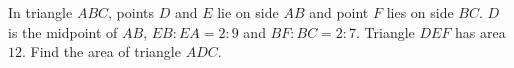 In triangle $ABC$, points $D$ and $E$ lie on side $AB$ and point $F$ lies on side $BC$. $D$ is the midpoint of $AB$, $EB:EA=2:9$ and $BF:BC=2:7$. Triangle $DEF$ has area $12$. Find the area of triangle $ADC$.

